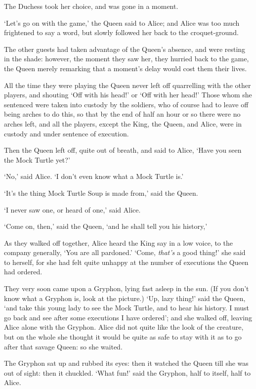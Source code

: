 \documentclass[12pt,openany]{memoir}
\begin{document}
The Duchess took her choice, and was gone in a moment.

`Let's go on with the game,' the Queen said to Alice; and Alice was too much frightened to say a word, but slowly followed her back to the croquet-ground.

The other guests had taken advantage of the Queen's absence, and were resting in the shade: however, the moment they saw her, they hurried back to the game, the Queen merely remarking that a moment's delay would cost them their lives.

All the time they were playing the Queen never left off quarrelling with the other players, and shouting `Off with his head!' or `Off with her head!' Those whom she sentenced were taken into custody by the soldiers, who of course had to leave off being arches to do this, so that by the end of half an hour or so there were no arches left, and all the players, except the King, the Queen, and Alice, were in custody and under sentence of execution.

Then the Queen left off, quite out of breath, and said to Alice, `Have you seen the Mock Turtle yet?'

`No,' said Alice. `I don't even know what a Mock Turtle is.'

`It's the thing Mock Turtle Soup is made from,' said the Queen.

`I never saw one, or heard of one,' said Alice.

`Come on, then,' said the Queen, `and he shall tell you his history,'

As they walked off together, Alice heard the King say in a low voice, to the company generally, `You are all pardoned.' `Come, \textit{that's} a good thing!' she said to herself, for she had felt quite unhappy at the number of executions the Queen had ordered.

They very soon came upon a Gryphon, lying fast asleep in the sun. (If you don't know what a Gryphon is, look at the picture.) `Up, lazy thing!' said the Queen, `and take this young lady to see the Mock Turtle, and to hear his history. I must go back and see after some executions I have ordered'; and she walked off, leaving Alice alone with the Gryphon. Alice did not quite like the look of the creature, but on the whole she thought it would be quite as safe to stay with it as to go after that savage Queen: so she waited.

The Gryphon sat up and rubbed its eyes: then it watched the Queen till she was out of sight: then it chuckled. `What fun!' said the Gryphon, half to itself, half to Alice.
\end{document}
